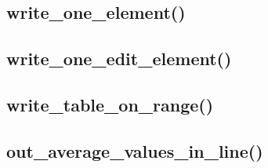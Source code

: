 \documentclass[12pt, a4paper]{article}
\begin{document}



\subsection{write\_one\_element()}






\subsection{write\_one\_edit\_element()}






\subsection{write\_table\_on\_range()}






\subsection{out\_average\_values\_in\_line()}


\end{document}
